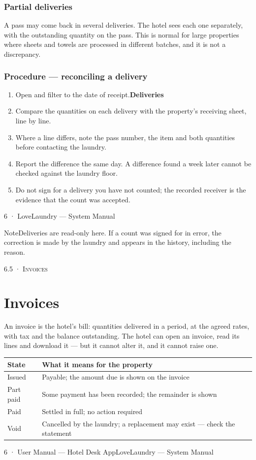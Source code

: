 \documentclass[11pt,a4paper,oneside]{book}
\begin{document}
\subsubsection*{Partial deliveries}
A pass may come back in several deliveries. The hotel sees each one separately, with the outstanding quantity on the pass. This is normal for large properties where sheets and towels are processed in different batches, and it is not a discrepancy.

\subsubsection*{Procedure — reconciling a delivery}
\begin{enumerate}
\item Open  and filter to the date of receipt.\textbf{Deliveries}
\item Compare the quantities on each delivery with the property's receiving sheet, line by line.
\item Where a line differs, note the pass number, the item and both quantities before contacting the laundry.
\item Report the difference the same day. A difference found a week later cannot be checked against the laundry floor.
\item Do not sign for a delivery you have not counted; the recorded receiver is the evidence that the count was accepted.
\end{enumerate}
6 · LoveLaundry — System Manual

\begin{notebox}NoteDeliveries are read-only here. If a count was signed for in error, the correction is made by the laundry and appears in the history, including the reason.\end{notebox}
\textsc{\small\color{crimson}6.5 · Invoices}\par\medskip
\section*{Invoices}
An invoice is the hotel's bill: quantities delivered in a period, at the agreed rates, with tax and the balance outstanding. The hotel can open an invoice, read its lines and download it — but it cannot alter it, and it cannot raise one.

\begin{center}\small
\begin{tabularx}{\linewidth}{|X|X|}
\hline
\rowcolor{lightgrey}
\textbf{State} & \textbf{What it means for the property} \\ \hline
Issued & Payable; the amount due is shown on the invoice \\ \hline
Part paid & Some payment has been recorded; the remainder is shown \\ \hline
Paid & Settled in full; no action required \\ \hline
Void & Cancelled by the laundry; a replacement may exist — check the statement \\ \hline
\end{tabularx}
\end{center}
6 · User Manual — Hotel Desk AppLoveLaundry — System Manual
\end{document}
